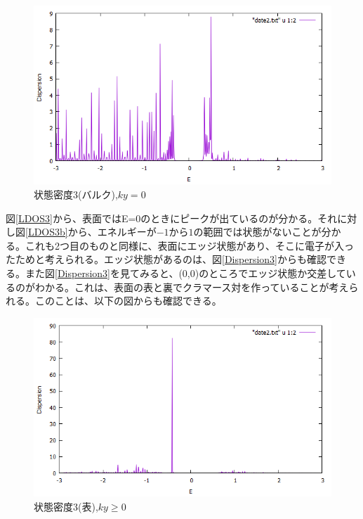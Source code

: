 \documentclass{jsarticle}
\begin{document}
            \begin{figure}[H]
                \centering
                \includegraphics[scale=0.5]{LDOS3b_bry.png}
                \caption{状態密度3(バルク),$ky=0$}
                \label{LDOS3b}
            \end{figure}
        
         	図\eqref{LDOS3}から、表面ではE=0のときにピークが出ているのが分かる。それに対し図\eqref{LDOS3b}から、エネルギーが$-1$から$1$の範囲では状態がないことが分かる。これも2つ目のものと同様に、表面にエッジ状態があり、そこに電子が入ったためと考えられる。エッジ状態があるのは、図\eqref{Dispersion3}からも確認できる。また図\eqref{Dispersion3}を見てみると、(0,0)のところでエッジ状態か交差しているのがわかる。これは、表面の表と裏でクラマース対を作っていることが考えられる。このことは、以下の図からも確認できる。
         	
         	\begin{figure}[H]
         		\centering
         		\includegraphics[scale=0.5]{LDOS3c_bry.png}
         		\caption{状態密度3(表),$ky\geq0$}
         		\label{LDOS3c}
         	\end{figure}
\end{document}
